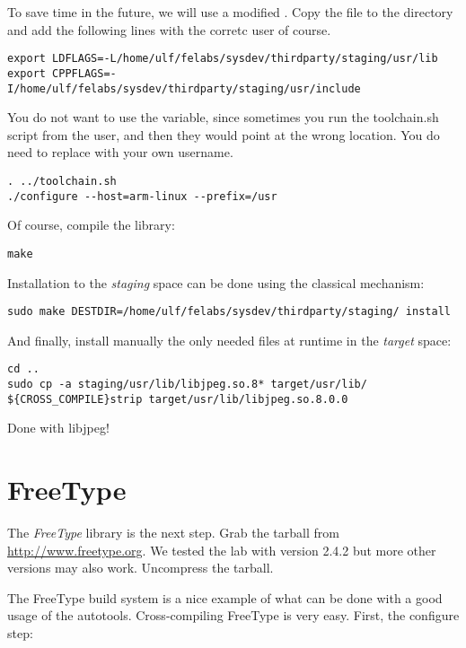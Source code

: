To save time in the future, we will use a modified .
Copy the file to the  directory and add the following lines
with the corretc user of course.

\begin{verbatim}
export LDFLAGS=-L/home/ulf/felabs/sysdev/thirdparty/staging/usr/lib
export CPPFLAGS=-I/home/ulf/felabs/sysdev/thirdparty/staging/usr/include
\end{verbatim}

You do not want to use the  variable, since sometimes you
run the toolchain.sh script from the  user, and
then they would point at the wrong location.
You do need to replace  with your own username.

\begin{verbatim}
. ../toolchain.sh
./configure --host=arm-linux --prefix=/usr
\end{verbatim}

Of course, compile the library:

\begin{verbatim}
make
\end{verbatim}

Installation to the {\em staging} space can be done using the
classical  mechanism:

\begin{verbatim}
sudo make DESTDIR=/home/ulf/felabs/sysdev/thirdparty/staging/ install
\end{verbatim}

And finally, install manually the only needed files at runtime in the
{\em target} space:

\begin{verbatim}
cd ..
sudo cp -a staging/usr/lib/libjpeg.so.8* target/usr/lib/
${CROSS_COMPILE}strip target/usr/lib/libjpeg.so.8.0.0
\end{verbatim}

Done with libjpeg!

\clearpage

\section{FreeType}

The {\em FreeType} library is the next step. Grab the tarball from
\url{http://www.freetype.org}. We tested the lab with version 2.4.2
but more other versions may also work. Uncompress the tarball.

The FreeType build system is a nice example of what can be done with a
good usage of the autotools. Cross-compiling FreeType is very
easy. First, the configure step:

